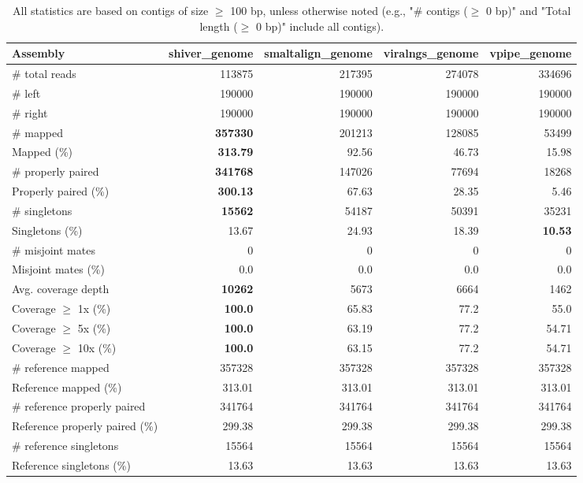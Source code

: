 \documentclass[12pt,a4paper]{article}
\begin{document}
\begin{table}[ht]
\begin{center}
\caption{All statistics are based on contigs of size $\geq$ 100 bp, unless otherwise noted (e.g., "\# contigs ($\geq$ 0 bp)" and "Total length ($\geq$ 0 bp)" include all contigs).}
\begin{tabular}{|l*{4}{|r}|}
\hline
Assembly & shiver\_genome & smaltalign\_genome & viralngs\_genome & vpipe\_genome \\ \hline
\# total reads & 113875 & 217395 & 274078 & 334696 \\ \hline
\# left & 190000 & 190000 & 190000 & 190000 \\ \hline
\# right & 190000 & 190000 & 190000 & 190000 \\ \hline
\# mapped & {\bf 357330} & 201213 & 128085 & 53499 \\ \hline
Mapped (\%) & {\bf 313.79} & 92.56 & 46.73 & 15.98 \\ \hline
\# properly paired & {\bf 341768} & 147026 & 77694 & 18268 \\ \hline
Properly paired (\%) & {\bf 300.13} & 67.63 & 28.35 & 5.46 \\ \hline
\# singletons & {\bf 15562} & 54187 & 50391 & 35231 \\ \hline
Singletons (\%) & 13.67 & 24.93 & 18.39 & {\bf 10.53} \\ \hline
\# misjoint mates & 0 & 0 & 0 & 0 \\ \hline
Misjoint mates (\%) & 0.0 & 0.0 & 0.0 & 0.0 \\ \hline
Avg. coverage depth & {\bf 10262} & 5673 & 6664 & 1462 \\ \hline
Coverage $\geq$ 1x (\%) & {\bf 100.0} & 65.83 & 77.2 & 55.0 \\ \hline
Coverage $\geq$ 5x (\%) & {\bf 100.0} & 63.19 & 77.2 & 54.71 \\ \hline
Coverage $\geq$ 10x (\%) & {\bf 100.0} & 63.15 & 77.2 & 54.71 \\ \hline
\# reference mapped & 357328 & 357328 & 357328 & 357328 \\ \hline
Reference mapped (\%) & 313.01 & 313.01 & 313.01 & 313.01 \\ \hline
\# reference properly paired & 341764 & 341764 & 341764 & 341764 \\ \hline
Reference properly paired (\%) & 299.38 & 299.38 & 299.38 & 299.38 \\ \hline
\# reference singletons & 15564 & 15564 & 15564 & 15564 \\ \hline
Reference singletons (\%) & 13.63 & 13.63 & 13.63 & 13.63 \\ \hline

\end{tabular}
\end{center}
\end{table}
\end{document}

